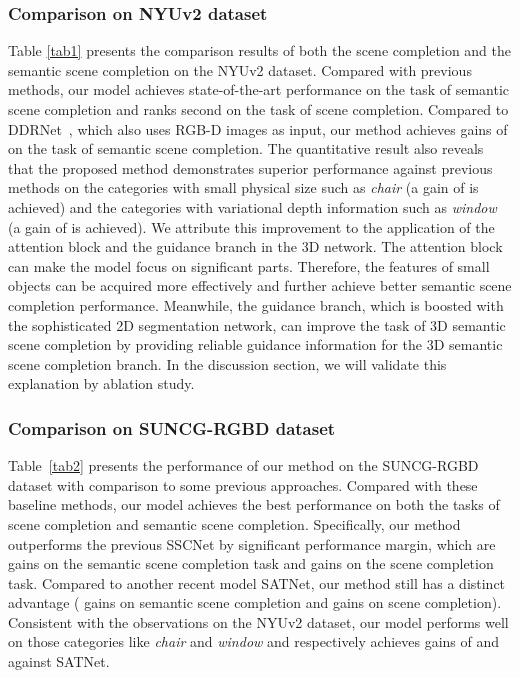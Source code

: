\documentclass[letterpaper]{article} \usepackage{aaai20}  \usepackage{times}  \usepackage{helvet} \usepackage{courier}  \usepackage[hyphens]{url}  \usepackage{graphicx} \urlstyle{rm} \def\UrlFont{\rm}  \usepackage{graphicx}  \frenchspacing  \setlength{\pdfpagewidth}{8.5in}  \setlength{\pdfpageheight}{11in}
\begin{document}
\subsubsection{Comparison on NYUv2 dataset}
Table \ref{tab1} presents the comparison results of both the scene completion and the semantic scene completion on the NYUv2 dataset. Compared with previous methods, our model achieves state-of-the-art performance on the task of semantic scene completion and ranks second on the task of scene completion. Compared to DDRNet~\cite{Li2019RGBDBD}, which also uses RGB-D images as input, our method achieves gains of  on the task of semantic scene completion. The quantitative result also reveals that the proposed method demonstrates superior performance against previous methods on the categories with small physical size such as \emph{chair} (a gain of  is achieved) and the categories with variational depth information such as \emph{window} (a gain of  is achieved). We attribute this improvement to the application of the attention block and the guidance branch in the 3D network. The attention block can make the model focus on significant parts. Therefore, the features of small objects can be acquired more effectively and further achieve better semantic scene completion performance. Meanwhile, the guidance branch, which is boosted with the sophisticated 2D segmentation network, can improve the task of 3D semantic scene completion by providing reliable guidance information for the 3D semantic scene completion branch. In the discussion section, we will validate this explanation by ablation study. 


\subsubsection{Comparison on SUNCG-RGBD dataset} 
Table~\ref{tab2} presents the performance of our method on the SUNCG-RGBD dataset with comparison to some previous approaches. 
Compared with these baseline methods, our model achieves the best performance on both the tasks of scene completion and semantic scene completion. Specifically, our method outperforms the previous SSCNet by significant performance margin, which are  gains on the semantic scene completion task and  gains on the scene completion task. Compared to another recent model SATNet, our method still has a distinct advantage ( gains on semantic scene completion and  gains on scene completion). 
Consistent with the observations on the NYUv2 dataset, our model performs well on those categories like \emph{chair} and \emph{window} and respectively achieves gains of  and  against SATNet. 
\end{document}
